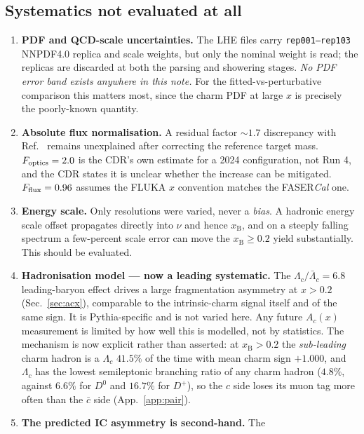 \documentclass[11pt,a4paper]{article}
\newcommand{\xB}{x_{\mathrm{B}}}
\begin{document}
\subsection{Systematics not evaluated at all}
\begin{enumerate}
  \item \textbf{PDF and QCD-scale uncertainties.} The LHE files carry
        \texttt{rep001--rep103} NNPDF4.0 replica and scale weights, but only the
        nominal weight is read; the replicas are discarded at both the parsing
        and showering stages. \emph{No PDF error band exists anywhere in this
        note.} For the fitted-vs-perturbative comparison this matters most,
        since the charm PDF at large $x$ is precisely the poorly-known quantity.
  \item \textbf{Absolute flux normalisation.} A residual factor $\sim1.7$
        discrepancy with Ref.~\cite{francener} remains unexplained after
        correcting the reference target mass. $F_{\rm optics}=2.0$ is the CDR's
        own estimate for a 2024 configuration, not Run 4, and the CDR states it
        is unclear whether the increase can be mitigated. $F_{\rm flux}=0.96$
        assumes the FLUKA $x$ convention matches the FASER\emph{Cal} one.
  \item \textbf{Energy scale.} Only resolutions were varied, never a
        \emph{bias}. A hadronic energy scale offset propagates directly into
        $\nu$ and hence $\xB$, and on a steeply falling spectrum a few-percent
        scale error can move the $\xB\geq0.2$ yield substantially. This should
        be evaluated.
  \item \textbf{Hadronisation model --- now a leading systematic.} The
        $\Lambda_c/\bar{\Lambda}_c=6.8$ leading-baryon effect drives a large
        fragmentation asymmetry at $x>0.2$ (Sec.~\ref{sec:acx}), comparable to
        the intrinsic-charm signal itself and of the same sign. It is
        Pythia-specific and is not varied here. Any future $A_c(x)$ measurement
        is limited by how well this is modelled, not by statistics. The
        mechanism is now explicit rather than asserted: at $\xB>0.2$ the
        \emph{sub-leading} charm hadron is a $\Lambda_c$ $41.5\%$ of the time
        with mean charm sign $+1.000$, and $\Lambda_c$ has the lowest
        semileptonic branching ratio of any charm hadron ($4.8\%$, against
        $6.6\%$ for $D^0$ and $16.7\%$ for $D^+$), so the $c$ side loses its muon
        tag more often than the $\bar{c}$ side (App.~\ref{app:pair}).
  \item \textbf{The predicted IC asymmetry is second-hand.} The

\end{enumerate}
\end{document}
